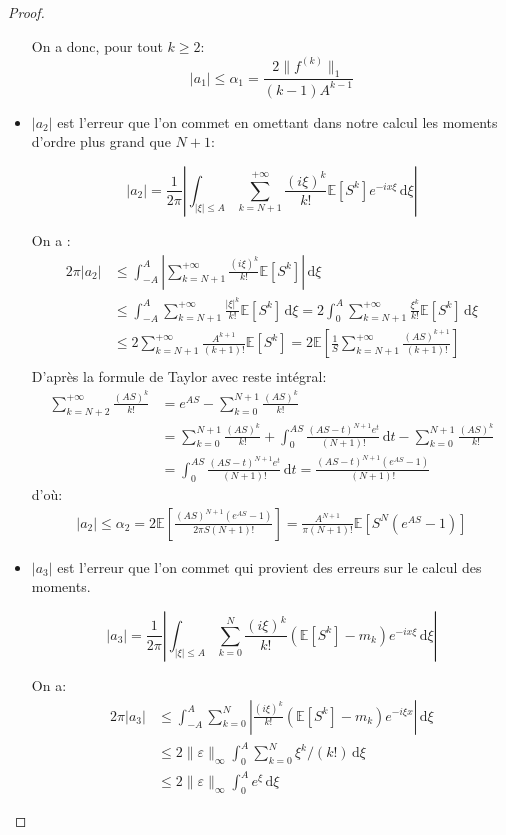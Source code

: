 \documentclass[12pt]{article}
\newcommand{\pth}[1]{\left(#1\right)}
\newcommand{\cro}[1]{\left[#1\right]}
\newcommand{\abs}[1]{\left|#1\right|}
\newcommand{\dabs}[1]{\|#1\|}
\newcommand{\Esp}[1]{\mathbb{E}\cro{#1}}
\newcommand{\de}{\,\mathrm{d}}
\begin{document}
\begin{proof}
\begin{itemize}
  On a donc, pour tout $k\geqslant 2$:
  \[\abs{a_1}\leqslant \alpha_1=\frac{2\dabs{f^{(k)}}_{1}}{(k-1)A^{k-1}}\] %
\item $\abs{a_2}$ est l'erreur que l'on commet en omettant dans notre calcul les moments d'ordre plus grand que $N+1$:

\[\abs{a_2} = \frac1{2\pi}\abs{\int_{\abs{\xi}\leqslant A}\sum_{k=N+1}^{+\infty}\frac{(i\xi)^k}{k!}\Esp{S^k}e^{-ix\xi}\de\xi}\]

On a :
  \begin{align*}
    2\pi\abs{a_2}&\leqslant \int_{-A}^A\abs{\sum_{k=N+1}^{+\infty}\frac{(i\xi)^k}{k!}\Esp{S^k}}\de\xi\\
    &\leqslant  \int_{-A}^A\sum_{k=N+1}^{+\infty}\frac{\abs{\xi}^k}{k!}\Esp{S^k}\de\xi=2 \int_{0}^A\sum_{k=N+1}^{+\infty}\frac{\xi^k}{k!}\Esp{S^k}\de\xi\\
    &\leqslant 2\sum_{k=N+1}^{+\infty}\frac{A^{k+1}}{(k+1)!}\Esp{S^k}=2\Esp{\frac{1}{S}\sum_{k=N+1}^{+\infty}\frac{(AS)^{k+1}}{(k+1)!}}\\
  \end{align*}
  D'après la formule de Taylor avec reste intégral:
  \begin{align*}
    \sum_{k=N+2}^{+\infty}\frac{(AS)^{k}}{k!}&=e^{AS}-\sum_{k=0}^{N+1}\frac{(AS)^{k}}{k!}\\
    &=\sum_{k=0}^{N+1}\frac{(AS)^{k}}{k!}+\int_{0}^{AS}\frac{(AS-t)^{N+1}e^t}{(N+1)!}\de t-\sum_{k=0}^{N+1}\frac{(AS)^{k}}{k!}\\
    &=\int_{0}^{AS}\frac{(AS-t)^{N+1}e^t}{(N+1)!}\de t = \frac{(AS-t)^{N+1}(e^{AS}-1)}{(N+1)!}
  \end{align*}
  d'où:
  \begin{align*}
    \abs{a_2}\leqslant \alpha_2= 2\Esp{\frac{(AS)^{N+1}(e^{AS}-1)}{2\pi S(N+1)!}}=\frac{A^{N+1}}{\pi(N+1)!}\Esp{S^N(e^{AS}-1)}
  \end{align*}

\item $\abs{a_3}$ est l'erreur que l'on commet qui provient des erreurs sur le calcul des moments.

\[\abs{a_3} = \frac1{2\pi}\abs{\int_{\abs{\xi}\leqslant A}\sum_{k=0}^{N}\frac{(i\xi)^k}{k!}\pth{\Esp{S^k}-m_k}e^{-ix\xi}\de\xi}\]

On a:
  \begin{align*} 
    2\pi\abs{a_3}&\leqslant \int_{-A}^A\sum_{k=0}^{N}\abs{\frac{(i\xi)^k}{k!}\pth{\Esp{S^k}-m_k}e^{-i\xi x}}\de\xi\\
    &\leqslant 2\dabs{\varepsilon}_{\infty}\int_{0}^A\sum_{k=0}^{N}\xi^k/(k!)\de\xi\\
    &\leqslant 2\dabs{\varepsilon}_{\infty}\int_{0}^Ae^{\xi}\de\xi
  \end{align*}


\end{itemize}
\end{proof}
\end{document}
